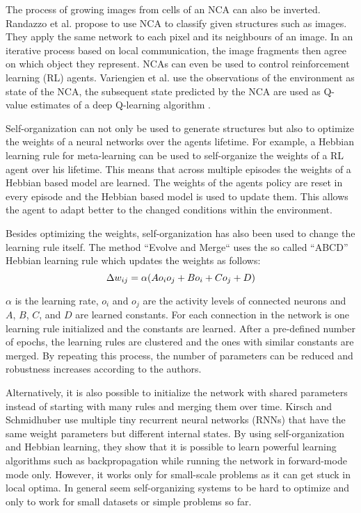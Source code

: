 The process of growing images from cells of an NCA can also be inverted.
Randazzo et al.  propose to use NCA to classify given structures such as images.
They apply the same network to each pixel and its neighbours of an image.
In an iterative process based on local communication, the image fragments then agree on which object they represent.
NCAs can even be used to control reinforcement learning (RL) agents.
Variengien et al.  use the observations of the environment as state of the NCA, the subsequent state predicted by the NCA are used as Q-value estimates of a deep Q-learning algorithm .

Self-organization can not only be used to generate structures but also to optimize the weights of a neural networks over the agents lifetime.
For example, a Hebbian learning rule for meta-learning can be used to self-organize the weights of a RL agent over his lifetime.
This means that across multiple episodes the weights of a Hebbian based model are learned.
The weights of the agents policy are reset in every episode and the Hebbian based model is used to update them.
This allows the agent to adapt better to the changed conditions within the environment.

Besides optimizing the weights, self-organization has also been used to change the learning rule itself.
The method ``Evolve and Merge``  uses the so called ``ABCD'' Hebbian learning rule which updates the weights as follows:
\begin{equation}\eqlbl{McCulloch_Pitts_act}
	\Delta w_{ij} = \alpha (A o_i o_j + B o_i + C o_j + D)
\end{equation}%

$\alpha$ is the learning rate, $o_i$ and $o_j$ are the activity levels of connected neurons and $A$, $B$, $C$, and $D$ are learned constants.
For each connection in the network is one learning rule initialized and the constants are learned.
After a pre-defined number of epochs, the learning rules are clustered and the ones with similar constants are merged.
By repeating this process, the number of parameters can be reduced and robustness increases according to the authors.

Alternatively, it is also possible to initialize the network with shared parameters instead of starting with many rules and merging them over time.
Kirsch and Schmidhuber  use multiple tiny recurrent neural networks (RNNs) that have the same weight parameters but different internal states.
By using self-organization and Hebbian learning, they show that it is possible to learn powerful learning algorithms such as backpropagation while running the network in forward-mode mode only.
However, it works only for small-scale problems as it can get stuck in local optima.
In general seem self-organizing systems to be hard to optimize and only to work for small datasets or simple problems so far.

